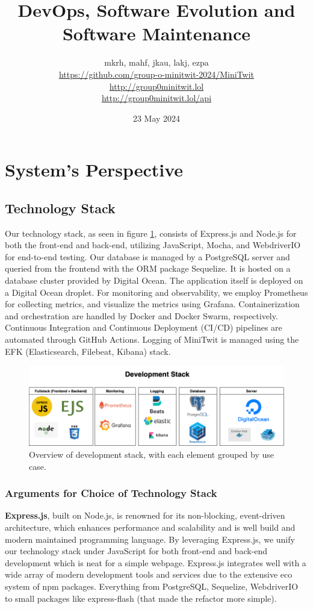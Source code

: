 \documentclass[11pt]{article}
\title{DevOps, Software Evolution and Software Maintenance}
\author{mkrh, mahf, jkau, lakj, ezpa \\
\url{https://github.com/group-o-minitwit-2024/MiniTwit}\\
\url{http://group0minitwit.lol}\\
\url{http://group0minitwit.lol/api}
}
\date{23 May 2024}
\begin{document}
\maketitle

\section{System's Perspective}
\subsection{Technology Stack}
Our technology stack, as seen in figure \ref{fig:dev-stack}, consists of Express.js and Node.js for both the front-end and back-end, utilizing JavaScript, Mocha, and WebdriverIO for end-to-end testing. Our database is managed by a PostgreSQL server and queried from the frontend with the ORM package Sequelize. It is hosted on a database cluster provided by Digital Ocean. The application itself is deployed on a Digital Ocean droplet. For monitoring and observability, we employ Prometheus for collecting metrics, and visualize the metrics using Grafana. Containerization and orchestration are handled by Docker and Docker Swarm, respectively. Continuous Integration and Continuous Deployment (CI/CD) pipelines are automated through GitHub Actions. Logging of MiniTwit is managed using the EFK (Elasticsearch, Filebeat, Kibana) stack.

\begin{figure}[!h]
    \centering
    \includegraphics[width=\textwidth]{images/techstack.png}
    \caption{Overview of development stack, with each element grouped by use case.}
    \label{fig:dev-stack}
\end{figure}

\subsubsection{Arguments for Choice of Technology Stack}
\textbf{Express.js}, built on Node.js, is renowned for its non-blocking, event-driven architecture, which enhances performance and scalability and is well build and modern maintained programming language. By leveraging Express.js, we unify our technology stack under JavaScript for both front-end and back-end development which is neat for a simple webpage. Express.js integrates well with a wide array of modern development tools and services due to the extensive eco system of npm packages. Everything from PostgreSQL, Sequelize, WebdriverIO to small packages like express-flash (that made the refactor more simple).
\end{document}
